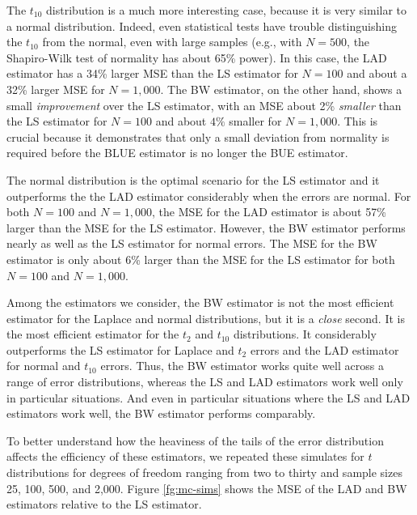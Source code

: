 \documentclass[12pt]{article}
\begin{document}
The $t_{10}$ distribution is a much more interesting case, because it is very similar to a normal distribution. 
Indeed, even statistical tests have trouble distinguishing the $t_{10}$ from the normal, even with large samples (e.g., with $N = 500$, the Shapiro-Wilk test of normality has about 65\% power). 
In this case, the LAD estimator has a 34\% larger MSE than the LS estimator for $N = 100$ and about a 32\% larger MSE for $N = 1,000$. 
The BW estimator, on the other hand, shows a small \textit{improvement} over the LS estimator, with an MSE about 2\% \textit{smaller} than the LS estimator for $N = 100$ and about $4\%$ smaller for $N = 1,000$. 
This is crucial because it demonstrates that only a small deviation from normality is required before the BLUE estimator is no longer the BUE estimator. 

The normal distribution is the optimal scenario for the LS estimator and it outperforms the the LAD estimator considerably when the errors are normal. 
For both $N = 100$ and $N = 1,000$, the MSE for the LAD estimator is about 57\% larger than the MSE for the LS estimator. 
However, the BW estimator performs nearly as well as the LS estimator for normal errors. 
The MSE for the BW estimator is only about 6\% larger than the MSE for the LS estimator for both $N = 100$ and $N = 1,000$.

Among the estimators we consider, the BW estimator is not the most efficient estimator for the Laplace and normal distributions, but it is a \textit{close} second. 
It is the most efficient estimator for the $t_2$ and $t_{10}$ distributions. 
It considerably outperforms the LS estimator for Laplace and $t_2$ errors and the LAD estimator for normal and $t_{10}$ errors. 
Thus, the BW estimator works quite well across a range of error distributions, whereas the LS and LAD estimators work well only in particular situations. 
And even in particular situations where the LS and LAD estimators work well, the BW estimator performs comparably.

To better understand how the heaviness of the tails of the error distribution affects the efficiency of these estimators, we repeated these simulates for $t$ distributions for degrees of freedom ranging from two to thirty and sample sizes 25, 100, 500, and 2,000. Figure \ref{fg:mc-sims} shows the MSE of the LAD and BW estimators relative to the LS estimator.
\end{document}
